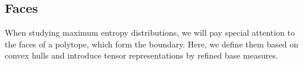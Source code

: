 %
%


\subsection{Faces}


When studying maximum entropy distributions, we will pay special attention to the faces of a polytope, which form the boundary.
Here, we define them based on convex hulls and introduce tensor representations by refined base measures.

